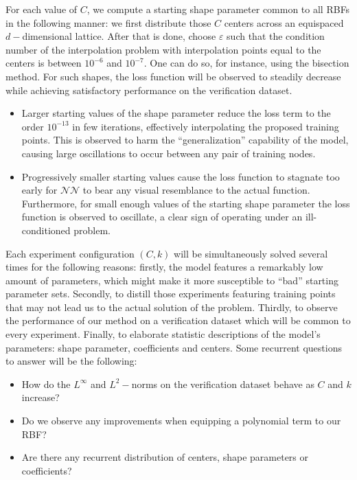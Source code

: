 \documentclass[12pt]{report} %
\begin{document}
For each value of $C$, we compute a starting shape parameter common to all RBFs in the following manner: we first distribute those $C$ centers across an equispaced $d-$dimensional lattice. After that is done, choose $\varepsilon$ such that the condition number of the interpolation problem with interpolation points equal to the centers is between $10^{-6}$ and $10^{-7}$. One can do so, for instance, using the bisection method. For such shapes, the loss function will be observed to steadily decrease while achieving satisfactory performance on the verification dataset. 
\begin{itemize}
  \item Larger starting values of the shape parameter reduce the loss term to the order $10^{-13}$ in few iterations, effectively interpolating the proposed training points. This is observed to harm the ``generalization'' capability of the model, causing large oscillations to occur between any pair of training nodes.
  \item Progressively smaller starting values cause the loss function to stagnate too early for $\mathcal{NN}$ to bear any visual resemblance to the actual function. Furthermore, for small enough values of the starting shape parameter the loss function is observed to oscillate, a clear sign of operating under an ill-conditioned problem.
\end{itemize}

Each experiment configuration $(C,k)$ will be simultaneously solved several times for the following reasons: firstly, the model features a remarkably low amount of parameters, which might make it more susceptible to ``bad'' starting parameter sets. Secondly, to distill those experiments featuring training points that may not lead us to the actual solution of the problem. Thirdly, to observe the performance of our method on a verification dataset which will be common to every experiment. Finally, to elaborate statistic descriptions of the model's parameters: shape parameter, coefficients and centers. Some recurrent questions to answer will be the following:

\begin{itemize}
  \item How do the $L^\infty$ and $L^2-$norms on the verification dataset behave as $C$ and $k$ increase?
  \item Do we observe any improvements when equipping a polynomial term to our RBF?
  \item Are there any recurrent distribution of centers, shape parameters or coefficients?
\end{itemize}
\end{document}
